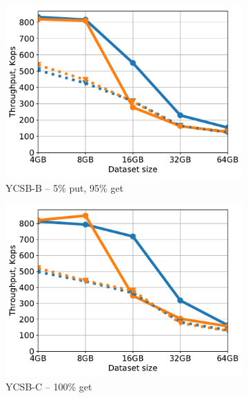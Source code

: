 \begin{figure}[tb]
\begin{subfigure}{0.33\linewidth}
\includegraphics[width=\textwidth]{figs/Workload_B_line.pdf}
\caption{YCSB-B -- 5\% put, 95\% get}
\label{fig:throughput:b}
\end{subfigure}
\hspace{70pt}
\begin{subfigure}{0.33\linewidth}
\includegraphics[width=\textwidth]{figs/Workload_C_line.pdf}
\caption{YCSB-C -- 100\% get}
\label{fig:throughput:c}
\end{subfigure}
\begin{subfigure}{0.33\linewidth}

\end{subfigure}
\end{figure}
